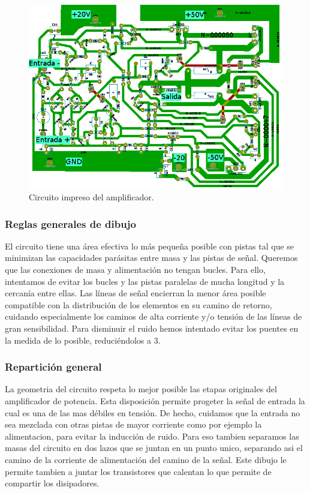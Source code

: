 \begin{figure}[H]
\centering
\includegraphics[width=\textwidth]{img/PCB1.png}
\caption{Circuito impreso del amplificador.}
\end{figure}

\subsubsection*{Reglas generales de dibujo}
El circuito tiene una área efectiva lo más pequeña posible con pistas tal que se minimizan las capacidades parásitas entre masa y las pistas de señal.
Queremos que las conexiones de masa y alimentación no tengan bucles. Para ello, intentamos de evitar los bucles y las pistas paralelas de mucha longitud y la cercanía entre ellas.
Las líneas de señal encierran la menor área posible compatible con la distribución de los elementos en su camino de retorno, cuidando especialmente los caminos de alta corriente y/o tensión de las líneas de gran sensibilidad.
Para disminuir el ruido hemos intentado evitar los puentes en la medida de lo posible, reduciéndolos a 3.\\

\subsubsection*{Repartición general}
La geometria del circuito respeta lo mejor posible las etapas originales del amplificador de potencia.  Esta disposición permite progeter la señal de entrada la cual es una de las mas débiles en tensión. De hecho, cuidamos que la entrada no sea mezclada con otras pistas de mayor corriente como por ejemplo la alimentacion, para evitar la inducción de ruido. Para eso tambien separamos las masas del circuito en dos lazos que se juntan en un punto unico, separando asi el camino de la corriente de alimentación del camino de la señal.
Este dibujo le permite tambien a juntar los transistores que calentan lo que permite de compartir los disipadores.

